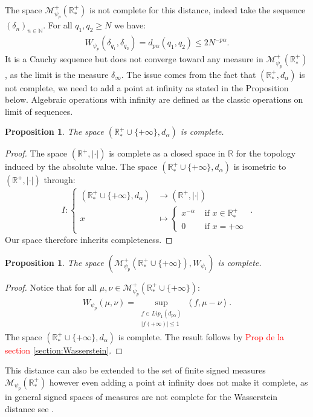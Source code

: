 \documentclass[11pt,a4paper]{article}
\newcommand{\RR}{\mathbb{R}}
\newcommand{\RRP}{\mathbb{R}^+_*}
\newcommand{\MC}{\mathcal{M}}
\newcommand{\red}[1]{\textcolor{red}{#1}}
\newcommand{\Seq}[1]{\left(#1\right)_{n\in \mathbb{N}}}
\newcommand{\brac}[1]{\left\langle#1\right\rangle}
\newtheorem{proposition}[theorem]{Proposition}
\begin{document}
The space $\MC^+_{\psi_p}\left(\RRP \right)$ is not complete for this distance, indeed take the sequence $\Seq{\delta_{n}}$. For all $q_1,q_2 \geq N$ we have:
\begin{align*}
    W_{\psi_p}\left(\delta_{q_1},\delta_{q_2}\right) = d_{p\alpha}\left(q_1,q_2 \right) \leq 2N^{-p\alpha}.
\end{align*}
It is a Cauchy sequence but does not converge toward any measure in $\MC^+_{\psi_p}\left(\RRP \right)$, as the limit is the measure $\delta_{\infty}$. The issue comes from the fact that $\left(\RRP,d_\alpha\right)$ is not complete, we need to add a point at infinity as stated in the Proposition below. Algebraic operations with infinity are defined as the classic operations on limit of sequences. 
\begin{proposition}
    The space $\left(\RRP \cup \lbrace+\infty\rbrace ,d_\alpha\right)$ is complete. 
\end{proposition}
\begin{proof}
    The space $(\RR^+,|\cdot|)$ is complete as a closed space in $\RR$ for the topology induced by the absolute value. The space $\left(\RRP \cup \lbrace+\infty\rbrace ,d_\alpha\right)$ is isometric to $(\RR^+,|\cdot|)$ through:
    \begin{equation*}
        I :
        \left\lbrace
        \begin{aligned}
            \left(\RRP \cup \lbrace+\infty\rbrace ,d_\alpha\right) &\to (\RR^+,|\cdot|)  \\
            x &\mapsto 
            \left\lbrace 
            \begin{aligned}
                x^{-\alpha} &\text{ if } x \in \RRP \\
                0 &\text{ if } x= +\infty
            \end{aligned}
            \right.
        \end{aligned}
        \right. .
    \end{equation*}
    Our space therefore inherits completeness.
\end{proof}

\begin{proposition}
    The space $\left( \MC^+_{\psi_p}\left(\RRP \cup \lbrace+\infty\rbrace\right),W_{\psi_1}\right) $ is complete.
\end{proposition}
\begin{proof}
    Notice that for all $\mu,\nu \in \MC^+_{\psi_p}\left(\RRP \cup \lbrace+\infty\rbrace\right)$:
    \begin{align*}
        W_{\psi_p}(\mu,\nu) = \sup_{\substack{f \in Lip_1(d_{p\alpha}) \\ |f(+\infty)| \leq 1 }} \brac{f, \mu - \nu}.
    \end{align*}
    The space $\left(\RRP \cup \lbrace+\infty\rbrace ,d_\alpha\right)$ is complete. The result follows by \red{Prop de la section \ref{section:Wasserstein}}.
\end{proof}
This distance can also be extended to the set of finite signed measures $\MC_{\psi_p}(\RRP)$ however even adding a point at infinity does not make it complete, as in general signed spaces of measures are not complete for the Wasserstein distance see \cite{piccoli2019wasserstein}.
\end{document}
